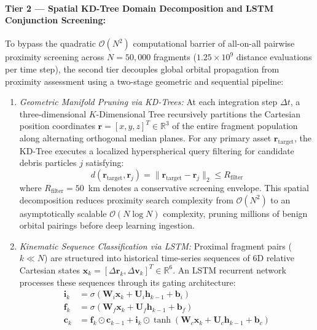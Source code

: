 \paragraph{Tier 2 --- Spatial KD-Tree Domain Decomposition and LSTM Conjunction Screening:}
To bypass the quadratic $\mathcal{O}(N^2)$ computational barrier of all-on-all pairwise proximity screening across $N = 50,000$ fragments ($1.25 \times 10^9$ distance evaluations per time step), the second tier decouples global orbital propagation from proximity assessment using a two-stage geometric and sequential pipeline:
\begin{enumerate}
    \item \textit{Geometric Manifold Pruning via KD-Trees:} At each integration step $\Delta t$, a three-dimensional $K$-Dimensional Tree recursively partitions the Cartesian position coordinates $\mathbf{r} = [x, y, z]^T \in \mathbb{R}^3$ of the entire fragment population along alternating orthogonal median planes. For any primary asset $\mathbf{r}_{\text{target}}$, the KD-Tree executes a localized hyperspherical query filtering for candidate debris particles $j$ satisfying:
    \begin{equation}
    d(\mathbf{r}_{\text{target}}, \mathbf{r}_j) = \|\mathbf{r}_{\text{target}} - \mathbf{r}_j\|_2 \le R_{\text{filter}}
    \label{eq:kdtree_filter}
    \end{equation}
    where $R_{\text{filter}} = 50$~km denotes a conservative screening envelope. This spatial decomposition reduces proximity search complexity from $\mathcal{O}(N^2)$ to an asymptotically scalable $\mathcal{O}(N \log N)$ complexity, pruning millions of benign orbital pairings before deep learning ingestion.
    \item \textit{Kinematic Sequence Classification via LSTM:} Proximal fragment pairs ($k \ll N$) are structured into historical time-series sequences of 6D relative Cartesian states $\mathbf{x}_k = [\Delta \mathbf{r}_k, \Delta \mathbf{v}_k]^T \in \mathbb{R}^6$. An LSTM recurrent network processes these sequences through its gating architecture:
    \begin{align}
    \mathbf{i}_k &= \sigma(\mathbf{W}_i \mathbf{x}_k + \mathbf{U}_i \mathbf{h}_{k-1} + \mathbf{b}_i) \label{eq:lstm_i} \\
    \mathbf{f}_k &= \sigma(\mathbf{W}_f \mathbf{x}_k + \mathbf{U}_f \mathbf{h}_{k-1} + \mathbf{b}_f) \label{eq:lstm_f} \\
    \mathbf{c}_k &= \mathbf{f}_k \odot \mathbf{c}_{k-1} + \mathbf{i}_k \odot \tanh(\mathbf{W}_c \mathbf{x}_k + \mathbf{U}_c \mathbf{h}_{k-1} + \mathbf{b}_c) \label{eq:lstm_c} \\

\end{align}
\end{enumerate}
